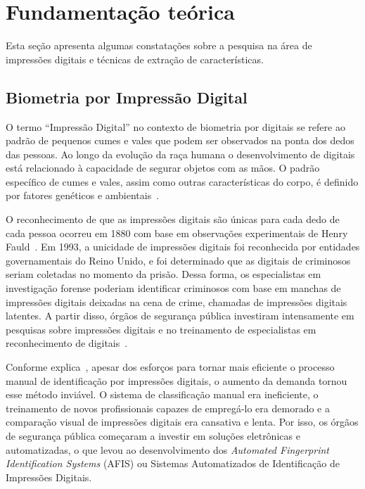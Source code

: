 \section{Fundamentação teórica}\label{sec:fundamentacao_teorica}

Esta seção apresenta algumas constatações sobre a pesquisa na área de impressões digitais e técnicas de extração de características.

\subsection{Biometria por Impressão Digital}\label{subsec:impressoes_digitais}

O termo ``Impressão Digital'' no contexto de biometria por digitais se refere ao padrão de pequenos cumes e vales que podem ser observados na ponta dos dedos das pessoas. Ao longo da evolução da raça humana o desenvolvimento de digitais está relacionado à capacidade de segurar objetos com as mãos. O padrão específico de cumes e vales, assim como outras características do corpo, é definido por fatores genéticos e ambientais~\cite{handbook_of_fp_recognition}.

O reconhecimento de que as impressões digitais são únicas para cada dedo de cada pessoa ocorreu em 1880 com base em observações experimentais de Henry Fauld~\cite{FingerPrintTechniques}. Em 1993, a unicidade de impressões digitais foi reconhecida por entidades governamentais do Reino Unido, e foi determinado que as digitais de criminosos seriam coletadas no momento da prisão. Dessa forma, os especialistas em investigação forense poderiam identificar criminosos com base em manchas de impressões digitais deixadas na cena de crime, chamadas de impressões digitais latentes. A partir disso, órgãos de segurança pública investiram intensamente em pesquisas sobre impressões digitais e no treinamento de especialistas em reconhecimento de digitais~\cite{FingerPrintMechanics}.

Conforme explica~, apesar dos esforços para tornar mais eficiente o processo manual de identificação por impressões digitais, o aumento da demanda tornou esse método inviável. O sistema de classificação manual era ineficiente, o treinamento de novos profissionais capazes de empregá-lo era demorado e a comparação visual de impressões digitais era cansativa e lenta. Por isso, os órgãos de segurança pública começaram a investir em soluções eletrônicas e automatizadas, o que levou ao desenvolvimento dos \textit{Automated Fingerprint Identification Systems} (AFIS) ou Sistemas Automatizados de Identificação de Impressões Digitais. 

